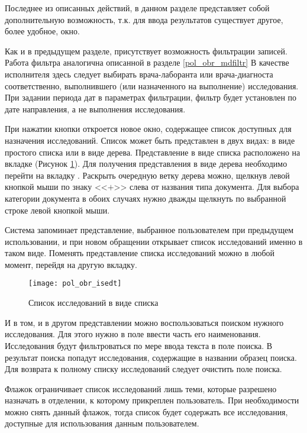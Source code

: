 Последнее из описанных действий, в данном разделе представляет собой дополнительную возможность, т.к. для ввода результатов существует другое, более удобное, окно.

Как и в предыдущем разделе, присутствует возможность фильтрации записей. Работа фильтра аналогична описанной в разделе \ref{pol_obr_mdfiltr} В качестве исполнителя здесь следует выбирать врача-лаборанта или врача-диагноста соответственно, выполнившего (или назначенного на выполнение) исследования. При задании периода дат в параметрах фильтрации, фильтр будет установлен по дате направления, а не выполнения исследования.

При нажатии кнопки   откроется новое окно, содержащее список доступных для назначения исследований. Список может быть представлен в двух видах: в виде простого списка или в виде дерева. Представление в виде списка расположено на вкладке  (Рисунок \ref{img_pol_obr_isedt}). Для получения представления в виде дерева необходимо перейти на вкладку . Раскрыть очередную ветку дерева можно, щелкнув левой кнопкой мыши по знаку <<$+$>> слева от названия типа документа. Для выбора категории документа в обоих случаях нужно дважды щелкнуть по выбранной строке левой кнопкой мыши.

Система запоминает представление, выбранное пользователем при предыдущем использовании, и при новом обращении открывает список исследований именно в таком виде. Поменять представление списка исследований можно в любой момент, перейдя на другую вкладку.

 \begin{figure}[ht]\centering
   \texttt{[image: pol\_obr\_isedt]}
   \caption{Список исследований в виде списка}
   \label{img_pol_obr_isedt}
 \end{figure}  
 
И в том, и в другом представлении можно воспользоваться поиском нужного исследования. Для этого нужно в поле  ввести часть его наименования. Исследования  будут фильтроваться по мере ввода текста в поле поиска. В результат поиска попадут исследования, содержащие в названии образец поиска. Для возврата к полному списку исследований следует очистить поле поиска.

Флажок  ограничивает список исследований лишь теми, которые разрешено назначать в отделении, к которому прикреплен пользователь. При необходимости можно снять данный флажок, тогда список будет содержать все исследования, доступные для использования данным пользователем.

